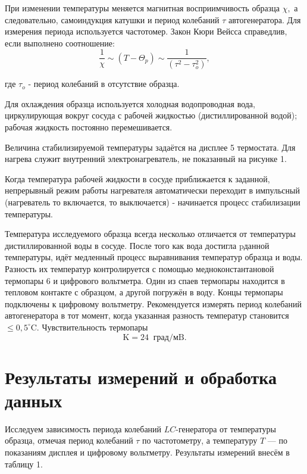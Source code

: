 \documentclass[a4paper]{article}
\theoremstyle{definition}
\theoremstyle{remark}
\begin{document}
\noindent При изменении температуры меняется магнитная восприимчивость образца $\chi,$ а следовательно, самоиндукция катушки и период колебаний $\tau$ автогенератора. Для измерения периода используется частотомер.
Закон Кюри Вейсса справедлив, если выполнено соотношение: 
\begin{equation*}
\frac{1}{\chi} \sim\left(T-\Theta_{p}\right) \sim \frac{1}{\left(\tau^{2}-\tau_{o}^{2}\right)},
\end{equation*}

где $\tau_{o}$ - период колебаний в отсутствие образца. \medskip

\noindent Для охлаждения образца используется холодная водопроводная вода, циркулирующая вокруг сосуда с рабочей жидкостью (дистиллированной водой); рабочая жидкость постоянно перемешивается. \medskip

\noindent Величина стабилизируемой температуры задаётся на дисплее 5 термостата. Для нагрева служит внутренний электронагреватель, не показанный на рисунке 1.

\noindent Когда температура рабочей жидкости в сосуде приближается к заданной, непрерывный режим работы нагревателя автоматически переходит в импульсный (нагреватель то включается, то выключается) - начинается процесс стабилизации температуры. \medskip

\noindent Температура исследуемого образца всегда несколько отличается от температуры дистиллированной воды в сосуде. После того как вода достигла pданной температуры, идёт медленный процесс выравнивания температур образца и воды. Разность их температур контролируется с помощью медноконстантановой термопары 6 и цифрового вольтметра. Один из спаев термопары находится в тепловом контакте с образцом, а другой погружён в воду. Концы термопары подключены к цифровому вольтметру. Рекомендуется измерять период колебаний автогенератора в тот момент, когда указанная разность температур становится $\leqslant 0,5^{\circ} \mathrm{C} .$ Чувствительность термопары $$\mathrm{K}=24 \;\;\text{град} / \mathrm{\text{мB}}.$$

\section{Результаты измерений и обработка данных}

Исследуем зависимость периода колебаний $LC$-генератора от температуры образца, отмечая период колебаний $\tau$ по частотометру, а температуру $T$ --- по показаниям дисплея и цифровому вольтметру. Результаты измерений внесём в таблицу 1.
\end{document}
